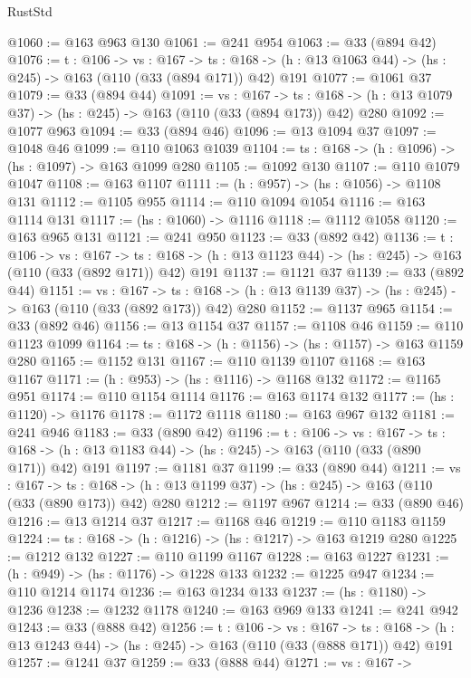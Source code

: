\begin{lexlean}{RustStd}
\begin{coremodule}
{\begin{coremodule}
{{{{{@1060 := @163 @963 @130
@1061 := @241 @954
@1063 := @33 (@894 @42)
@1076 := {t : @106} ->
  {vs : @167} ->
  {ts : @168} -> (h : @13 @1063 @44) -> (hs : @245) -> @163 (@110 (@33 (@894 @171)) @42) @191
@1077 := @1061 @37
@1079 := @33 (@894 @44)
@1091 := {vs : @167} ->
  {ts : @168} -> (h : @13 @1079 @37) -> (hs : @245) -> @163 (@110 (@33 (@894 @173)) @42) @280
@1092 := @1077 @963
@1094 := @33 (@894 @46)
@1096 := @13 @1094 @37
@1097 := @1048 @46
@1099 := @110 @1063 @1039
@1104 := {ts : @168} -> (h : @1096) -> (hs : @1097) -> @163 @1099 @280
@1105 := @1092 @130
@1107 := @110 @1079 @1047
@1108 := @163 @1107
@1111 := (h : @957) -> (hs : @1056) -> @1108 @131
@1112 := @1105 @955
@1114 := @110 @1094 @1054
@1116 := @163 @1114 @131
@1117 := (hs : @1060) -> @1116
@1118 := @1112 @1058
@1120 := @163 @965 @131
@1121 := @241 @950
@1123 := @33 (@892 @42)
@1136 := {t : @106} ->
  {vs : @167} ->
  {ts : @168} -> (h : @13 @1123 @44) -> (hs : @245) -> @163 (@110 (@33 (@892 @171)) @42) @191
@1137 := @1121 @37
@1139 := @33 (@892 @44)
@1151 := {vs : @167} ->
  {ts : @168} -> (h : @13 @1139 @37) -> (hs : @245) -> @163 (@110 (@33 (@892 @173)) @42) @280
@1152 := @1137 @965
@1154 := @33 (@892 @46)
@1156 := @13 @1154 @37
@1157 := @1108 @46
@1159 := @110 @1123 @1099
@1164 := {ts : @168} -> (h : @1156) -> (hs : @1157) -> @163 @1159 @280
@1165 := @1152 @131
@1167 := @110 @1139 @1107
@1168 := @163 @1167
@1171 := (h : @953) -> (hs : @1116) -> @1168 @132
@1172 := @1165 @951
@1174 := @110 @1154 @1114
@1176 := @163 @1174 @132
@1177 := (hs : @1120) -> @1176
@1178 := @1172 @1118
@1180 := @163 @967 @132
@1181 := @241 @946
@1183 := @33 (@890 @42)
@1196 := {t : @106} ->
  {vs : @167} ->
  {ts : @168} -> (h : @13 @1183 @44) -> (hs : @245) -> @163 (@110 (@33 (@890 @171)) @42) @191
@1197 := @1181 @37
@1199 := @33 (@890 @44)
@1211 := {vs : @167} ->
  {ts : @168} -> (h : @13 @1199 @37) -> (hs : @245) -> @163 (@110 (@33 (@890 @173)) @42) @280
@1212 := @1197 @967
@1214 := @33 (@890 @46)
@1216 := @13 @1214 @37
@1217 := @1168 @46
@1219 := @110 @1183 @1159
@1224 := {ts : @168} -> (h : @1216) -> (hs : @1217) -> @163 @1219 @280
@1225 := @1212 @132
@1227 := @110 @1199 @1167
@1228 := @163 @1227
@1231 := (h : @949) -> (hs : @1176) -> @1228 @133
@1232 := @1225 @947
@1234 := @110 @1214 @1174
@1236 := @163 @1234 @133
@1237 := (hs : @1180) -> @1236
@1238 := @1232 @1178
@1240 := @163 @969 @133
@1241 := @241 @942
@1243 := @33 (@888 @42)
@1256 := {t : @106} ->
  {vs : @167} ->
  {ts : @168} -> (h : @13 @1243 @44) -> (hs : @245) -> @163 (@110 (@33 (@888 @171)) @42) @191
@1257 := @1241 @37
@1259 := @33 (@888 @44)
@1271 := {vs : @167} ->
}}}}}
\end{coremodule}}
\end{coremodule}
\end{lexlean}
